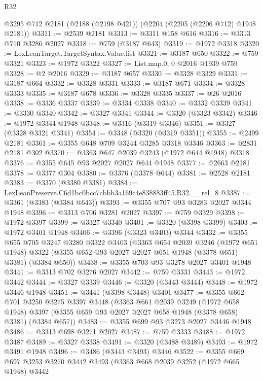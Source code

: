 \begin{lexlean}{R32}
\begin{coremodule}
    @3295
    @712
    @2181
    (@2188 (@2198 @421))
    (@2204 (@2205 (@2206 @712) @1948 @2181))
@3311 := @2539 @2181
@3313 := @3311 @158 @616
@3316 := @3313 @710 @3286 @2027
@3318 := @759 (@3187 @643)
@3319 := @1972 @3318
@3320 := LexLeanTarget.TargetSyntax.Value.list
@3321 := @3187 @650
@3322 := @759 @3321
@3323 := @1972 @3322
@3327 := List.map.{0, 0} @2016 @1939 @759
@3328 := @2 @2016
@3329 := @3187 @657
@3330 := @3328 @3329
@3331 := @3187 @664
@3332 := @3328 @3331
@3333 := @3187 @671
@3334 := @3328 @3333
@3335 := @3187 @678
@3336 := @3328 @3335
@3337 := @26 @2016
@3338 := @3336 @3337
@3339 := @3334 @3338
@3340 := @3332 @3339
@3341 := @3330 @3340
@3342 := @3327 @3341
@3344 := @3320 (@3323 @3342)
@3346 := @1972 @3344 @1948
@3348 := @3316 (@3319 @3346)
@3351 := @3327 (@3328 @3321 @3341)
@3354 := @3348 (@3320 (@3319 @3351))
@3355 := @2499 @2181
@3361 := @3355 @648 @709 @3244 @3285 @3318 @3346
@3363 := @2831 @2181 @302
@3370 := @3363 @647 @2039 @3243 (@1972 @644 @1948) @3318
@3376 := @3355 @645 @93 @2027 @2027 @644 @1948
@3377 := @2663 @2181
@3378 := @3377 @304
@3380 := @3376 (@3378 @644)
@3381 := @2528 @2181
@3383 := @3370 (@3380 @3381)
@3384 := LexLeanPreserve.C6d1bc0bcc7cbbb3a169c4e838883ff45.R32.__rel_8
@3387 := @3361 (@3383 (@3384 @643))
@3393 := @3355 @707 @93 @3283 @2027 @3344 @1948
@3396 := @3313 @706 @3281 @2027
@3397 := @759 @3329
@3398 := @1972 @3397
@3399 := @3327 @3340
@3401 := @3320 (@3398 @3399)
@3403 := @1972 @3401 @1948
@3406 := @3396 (@3323 @3403) @3344
@3432 := @3355
    @655
    @705
    @3247
    @3280
    @3322
    @3403
    (@3363
      @654
      @2039
      @3246
      (@1972 @651 @1948)
      @3322
      (@3355 @652 @93 @2027 @2027 @651 @1948 (@3378 @651) @3381)
      (@3384 @650))
@3438 := @3355 @703 @93 @3278 @2027 @3401 @1948
@3441 := @3313 @702 @3276 @2027
@3442 := @759 @3331
@3443 := @1972 @3442
@3444 := @3327 @3339
@3446 := @3320 (@3443 @3444)
@3448 := @1972 @3446 @1948
@3451 := @3441 (@3398 @3448) @3401
@3477 := @3355
    @662
    @701
    @3250
    @3275
    @3397
    @3448
    (@3363
      @661
      @2039
      @3249
      (@1972 @658 @1948)
      @3397
      (@3355 @659 @93 @2027 @2027 @658 @1948 (@3378 @658) @3381)
      (@3384 @657))
@3483 := @3355 @699 @93 @3273 @2027 @3446 @1948
@3486 := @3313 @698 @3271 @2027
@3487 := @759 @3333
@3488 := @1972 @3487
@3489 := @3327 @3338
@3491 := @3320 (@3488 @3489)
@3493 := @1972 @3491 @1948
@3496 := @3486 (@3443 @3493) @3446
@3522 := @3355
    @669
    @697
    @3253
    @3270
    @3442
    @3493
    (@3363
      @668
      @2039
      @3252
      (@1972 @665 @1948)
      @3442

\end{coremodule}
\end{lexlean}
